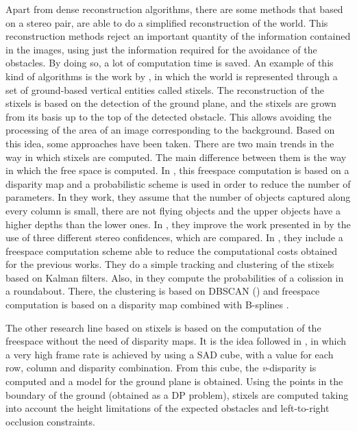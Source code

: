 Apart from dense reconstruction algorithms, there are some methods that based on a stereo pair, are able to do a simplified reconstruction of the world. This reconstruction methods reject an important quantity of the information contained in the images, using just the information required for the avoidance of the obstacles. By doing so, a lot of computation time is saved. An example of this kind of algorithms is the work by \cite{badino2009stixel}, in which the world is represented through a set of ground-based vertical entities called stixels. The reconstruction of the stixels is based on the detection of the ground plane, and the stixels are grown from its basis up to the top of the detected obstacle. This allows avoiding the processing of the area of an image corresponding to the background. 
Based on this idea, some approaches have been taken. There are two main trends in the way in which stixels are computed. The main difference between them is the way in which the free space is computed. In \cite{pfeiffer2011towards, pfeiffer2013exploiting, pfeiffer2010efficient, muffert2012may}, this freespace computation is based on a disparity map and a probabilistic scheme is used in order to reduce the number of parameters. In they work, they assume that the number of objects captured along every column is small, there are not flying objects and the upper objects have a higher depths than the lower ones. In \cite{pfeiffer2013exploiting}, they improve the work presented in \cite{pfeiffer2011towards} by the use of three different stereo confidences, which are compared. In \cite{pfeiffer2010efficient}, they include a freespace computation scheme able to reduce the computational costs obtained for the previous works. They do a simple tracking and clustering of the stixels based on Kalman filters. Also, in \cite{muffert2012may} they compute the probabilities of a colission in a roundabout. There, the clustering is based on DBSCAN (\cite{ester1996density}) and freespace computation is based on a disparity map combined with B-splines \cite{wedel2009b}. 

The other research line based on stixels is based on the computation of the freespace without the need of disparity maps. It is the idea followed in \cite{benenson2011stixels, benenson2012pedestrian, benenson2012fast, gunyel2012stixels}, in which a very high frame rate is achieved by using a \ac{SAD} cube, with a value for each row, column and disparity combination. From this cube, the \emph{v}-disparity is computed and a model for the ground plane is obtained. Using the points in the boundary of the ground (obtained as a \ac{DP} problem), stixels are computed taking into account the height limitations of the expected obstacles and left-to-right occlusion constraints. 

